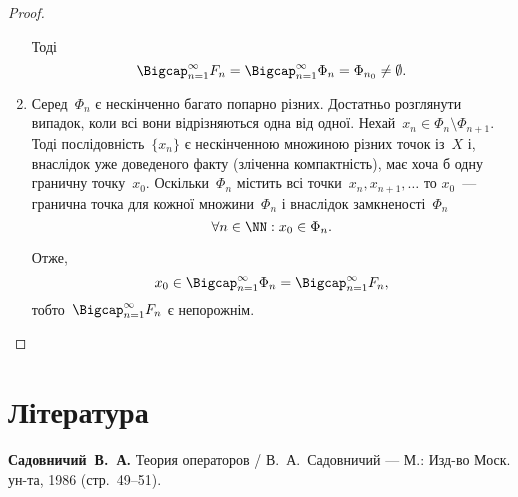 \begin{proof}
\begin{enumerate}
Тоді
\begin{equation*}
    \Bigcap_{n = 1}^\infty F_n = \Bigcap_{n = 1}^\infty \Phi_n = \Phi_{n_0} \ne \emptyset.
\end{equation*}

\item Серед~$\Phi_n$ є нескінченно багато попарно різних.
Достатньо розглянути випадок, коли всі вони
відрізняються одна від одної. Нехай~$x_n \in \Phi_n \setminus \Phi_{n + 1}$.
Тоді послідовність~$\{x_n\}$ є нескінченною множиною
різних точок із~$X$ і, внаслідок уже доведеного факту
(зліченна компактність), має хоча б одну граничну
точку~$x_0$. Оскільки~$\Phi_n$ містить всі точки~$x_n, x_{n + 1}, \dots$ то
$x_0$~--- гранична точка для кожної множини~$\Phi_n$ і
внаслідок замкненості~$\Phi_n$
\begin{equation*}
    \forall n \in \NN: x_0 \in \Phi_n.
\end{equation*}

Отже,
\begin{equation*}
    x_0 \in \Bigcap_{n = 1}^\infty \Phi_n = \Bigcap_{n = 1}^\infty F_n,
\end{equation*}
тобто~$\Bigcap_{n = 1}^\infty F_n$ є непорожнім. \qedhere
\end{enumerate}
\end{proof}

\section{Література}

\begin{enumerate}[label={[\arabic*]}]
\item \textbf{Садовничий~В.~А.}
Теория операторов /
В.~А.~Садовничий ---
М.: Изд-во Моск. ун-та, 1986 (стр.~49--51).
\end{enumerate}